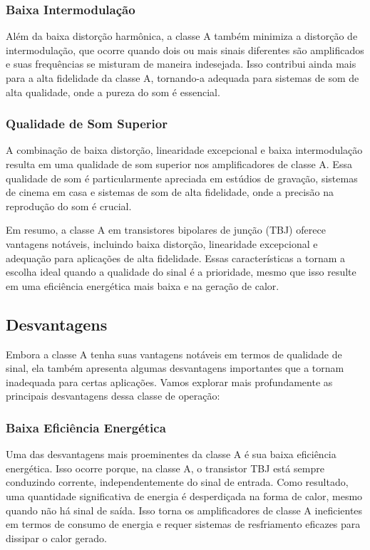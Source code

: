 \subsubsection{Baixa Intermodulação}

Além da baixa distorção harmônica, a classe A também minimiza a distorção de intermodulação, que ocorre quando dois ou mais sinais diferentes são amplificados e suas frequências se misturam de maneira indesejada. Isso contribui ainda mais para a alta fidelidade da classe A, tornando-a adequada para sistemas de som de alta qualidade, onde a pureza do som é essencial.

\subsubsection{Qualidade de Som Superior}

A combinação de baixa distorção, linearidade excepcional e baixa intermodulação resulta em uma qualidade de som superior nos amplificadores de classe A. Essa qualidade de som é particularmente apreciada em estúdios de gravação, sistemas de cinema em casa e sistemas de som de alta fidelidade, onde a precisão na reprodução do som é crucial.

Em resumo, a classe A em transistores bipolares de junção (TBJ) oferece vantagens notáveis, incluindo baixa distorção, linearidade excepcional e adequação para aplicações de alta fidelidade. Essas características a tornam a escolha ideal quando a qualidade do sinal é a prioridade, mesmo que isso resulte em uma eficiência energética mais baixa e na geração de calor.

\subsection{Desvantagens}

Embora a classe A tenha suas vantagens notáveis em termos de qualidade de sinal, ela também apresenta algumas desvantagens importantes que a tornam inadequada para certas aplicações. Vamos explorar mais profundamente as principais desvantagens dessa classe de operação:

\subsubsection{Baixa Eficiência Energética}

Uma das desvantagens mais proeminentes da classe A é sua baixa eficiência energética. Isso ocorre porque, na classe A, o transistor TBJ está sempre conduzindo corrente, independentemente do sinal de entrada. Como resultado, uma quantidade significativa de energia é desperdiçada na forma de calor, mesmo quando não há sinal de saída. Isso torna os amplificadores de classe A ineficientes em termos de consumo de energia e requer sistemas de resfriamento eficazes para dissipar o calor gerado.

